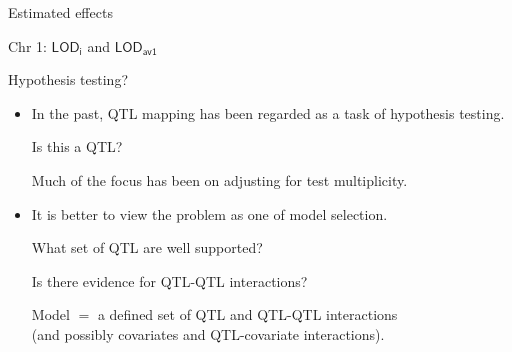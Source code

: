 \documentclass[aspectratio=169,12pt,t]{beamer}
\newcommand{\lod}{\text{LOD}}
\begin{document}
\begin{frame}[c]{Estimated effects}


\end{frame}








\begin{frame}[c]{Chr 1: $\mathsf{\lod_i}$ and $\mathsf{\lod_{av1}}$}


\end{frame}







\begin{frame}{Hypothesis testing?}

\vspace{2cm}


\hfill \begin{minipage}[t]{10in}
\begin{itemize}
\itemsep20mm
\item In the past, QTL mapping has been regarded as a task of
  {\hilit hypothesis testing}.

\vspace{10mm}

\hspace{15mm} {\lolit Is this a QTL?}

\vspace{10mm}

Much of the focus has been on adjusting for test multiplicity.

\item It is better to view the problem as one of {\hilit model
  selection}.

\vspace{10mm}

\hspace{15mm} {\lolit What set of QTL are well supported?}

\hspace{15mm} {\lolit Is there evidence for QTL-QTL
  interactions?}

\vspace{10mm}

{\hilit Model} $\mathsf{=}$ a defined set of QTL and QTL-QTL interactions
\\
(and possibly covariates and QTL-covariate interactions).

\end{itemize}
\end{minipage}

\end{frame}
\end{document}
